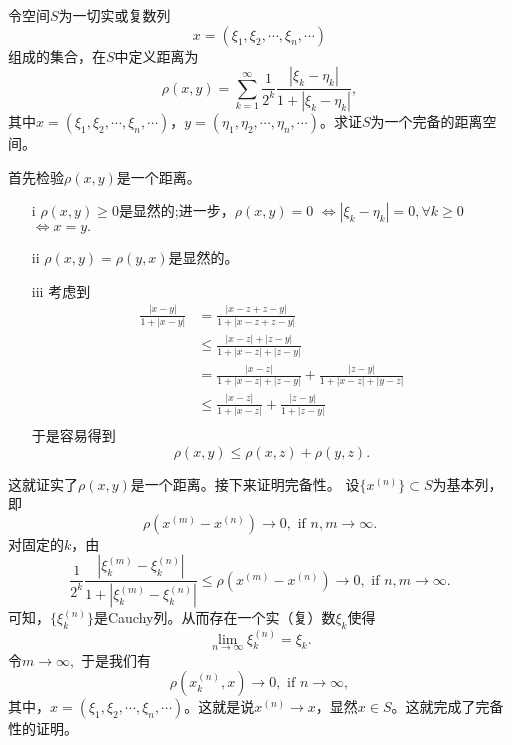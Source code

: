 \begin{exercise}
令空间$S$为一切实或复数列
$$x=(\xi_1,\xi_2,\cdots,\xi_n,\cdots)$$
组成的集合，在$S$中定义距离为
$$\rho(x,y)=\sum_{k=1}^{\infty}\frac{1}{2^k}\frac{|\xi_k-\eta_k|}{1+|\xi_k-\eta_k|},$$
其中$x=(\xi_1,\xi_2,\cdots,\xi_n,\cdots)$，$y=(\eta_1,\eta_2,\cdots,\eta_n,\cdots)$。求证$S$为一个完备的距离空间。

首先检验$\rho(x,y)$是一个距离。
\begin{enumerate}
\item[i] $\rho(x,y)\geq0$是显然的;进一步，$\rho(x,y)=0$ $\Longleftrightarrow|\xi_k-\eta_k|=0,\forall k\geq0$ $\Longleftrightarrow x=y.$
\item[ii] $\rho(x,y)=\rho(y,x)$是显然的。
\item[iii] 考虑到
\begin{align*}
\frac{|x-y|}{1+|x-y|}&=\frac{|x-z+z-y|}{1+|x-z+z-y|}\\
&\leq\frac{|x-z|+|z-y|}{1+|x-z|+|z-y|}\\
&=\frac{|x-z|}{1+|x-z|+|z-y|}+\frac{|z-y|}{1+|x-z|+|y-z|}\\
&\leq\frac{|x-z|}{1+|x-z|}+\frac{|z-y|}{1+|z-y|}\\
\end{align*}
于是容易得到
$$\rho(x,y)\leq\rho(x,z)+\rho(y,z).$$
\end{enumerate}
这就证实了$\rho(x,y)$是一个距离。接下来证明完备性。
设$\{x^{(n)}\}\subset S$为基本列，即
$$\rho(x^{(m)}-x^{(n)})\rightarrow0,\text{ if }n,m\rightarrow\infty.$$
对固定的$k$，由$$\frac{1}{2^k}\frac{|\xi^{(m)}_k-\xi^{(n)}_k|}{1+|\xi^{(m)}_k-\xi^{(n)}_k|}\leq\rho(x^{(m)}-x^{(n)})\rightarrow0,\text{ if }n,m\rightarrow\infty.$$
可知，$\{\xi_k^{(n)}\}$是Cauchy列。从而存在一个实（复）数$\xi_k$使得
$$\lim_{n\rightarrow\infty}\xi_k^{(n)}=\xi_k.$$
令$m\rightarrow\infty,$
于是我们有$$\rho(x_k^{(n)},x)\rightarrow0,\text{ if }n\rightarrow\infty,$$
其中，$x=(\xi_1,\xi_2,\cdots,\xi_n,\cdots)$。这就是说$x^{(n)}\rightarrow x$，显然$x\in S$。这就完成了完备性的证明。
\end{exercise}

